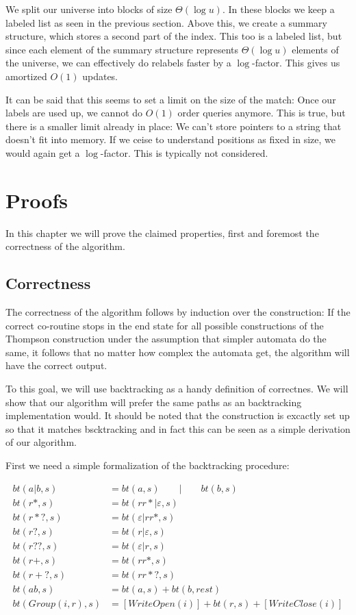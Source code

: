 \documentclass[11pt,a4paper,twoside,openright]{Thesis}
\theoremstyle{definition}
\begin{document}
We split our universe into blocks of size $\Theta(\log u)$. In these blocks we keep a 
labeled list as seen in the previous section. Above this, we create a summary 
structure, which stores a second part of the index. This too is a labeled 
list, but since each element of the summary structure represents 
$\Theta(\log u)$ elements of the universe, we can effectively do relabels 
faster by a $\log$-factor. This gives us amortized $O(1)$ updates.

It can be said that this seems to set a limit on the size of the match: Once 
our labels are used up, we cannot do $O(1)$ order queries anymore. This is 
true, but there is a smaller limit already in place: We can't store pointers 
to a string that doesn't fit into memory. If we ceise to understand positions 
as fixed in size, we would again get a $\log$-factor. This is typically not
considered.

\chapter{Proofs}
In this chapter we will prove the claimed properties, first and foremost the 
correctness of the algorithm.

\section{Correctness}
The correctness of the algorithm follows by induction over the construction:
If the correct co-routine stops in the end state for all possible
constructions of the Thompson construction under the assumption that simpler
automata do the same, it follows that no matter how complex the automata get,
the algorithm will have the correct output.

To this goal, we will use backtracking as a handy definition of correctnes. 
We will show that our algorithm will prefer the same paths as an backtracking 
implementation would. It should be noted that the construction is excactly 
set up so that it matches bscktracking and in fact this can be seen as a 
simple derivation of our algorithm.

First we need a simple formalization of the backtracking procedure:

\begin{align*}
  bt(a|b, s) &= bt(a, s)\qquad | \qquad bt(b, s)\\
  bt(r*, s) &= bt(rr*|\varepsilon, s)\\
  bt(r*?, s) &= bt(\varepsilon|rr*, s)\\
  bt(r?, s) &= bt(r|\varepsilon, s)\\
  bt(r??, s) &=  bt(\varepsilon|r, s)\\
  bt(r+, s) &= bt(rr*, s)\\
  bt(r+?, s) &= bt(rr*?, s)\\
  bt(ab, s) &= bt(a, s) + bt(b, rest)\\
  bt(Group(i, r), s) &= [WriteOpen(i)] + bt(r, s) + [WriteClose(i)]
\end{align*}
\end{document}
